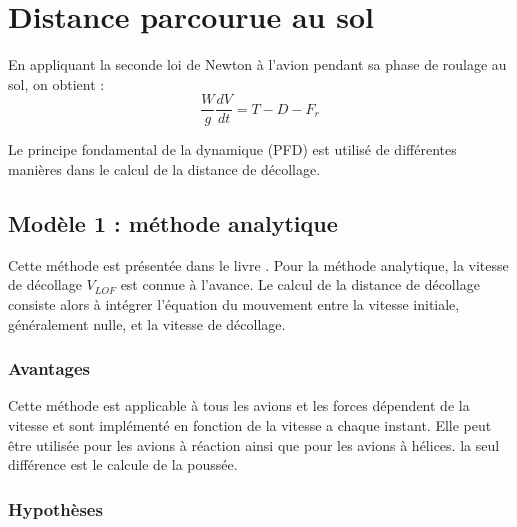 
\chapter{ Distance parcourue au sol   }\label{ch:structure}


	En appliquant la seconde loi de Newton à l’avion pendant sa phase de roulage au sol, on obtient :	
	\begin{equation}
		\frac{W}{g}\frac{dV}{dt}=T-D-F_r
		\tag{1.1}
	\end{equation}
	
	Le principe fondamental de la dynamique (PFD) est utilisé de différentes manières dans le calcul de la distance de décollage.
	
	
	
	
	
	
	
	
	
	
	\section{ Modèle 1 : méthode analytique }
		Cette méthode est présentée dans le livre  \cite{War:09}. 
		Pour la méthode analytique, la vitesse de décollage $V_{LOF}$ est connue à l'avance. Le calcul de la distance de décollage consiste alors à intégrer l'équation du mouvement entre la vitesse initiale, généralement nulle, et la vitesse de décollage.
		
		
		\subsection{Avantages}
		
			Cette méthode est applicable à tous les avions et les forces dépendent de la vitesse et sont implémenté en fonction de la vitesse a chaque instant. Elle peut être utilisée pour les avions à réaction ainsi que pour les avions à hélices. la seul différence est le calcule de la poussée.
			
			\vspace{0.3cm}
			
		\subsection{Hypothèses}
		
